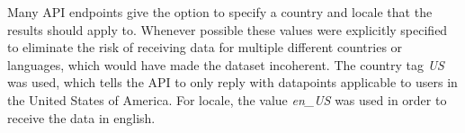 Many API endpoints give the option to specify a country and locale that the results should apply to.
Whenever possible these values were explicitly specified to eliminate the risk of receiving data for multiple different
countries or languages, which would have made the dataset incoherent.
The country tag \emph{US} was used, which tells the API to only reply with datapoints
applicable to users in the United States of America.
For locale, the value \emph{en\_US} was used in order to receive the data in english.

%
%
%
%
